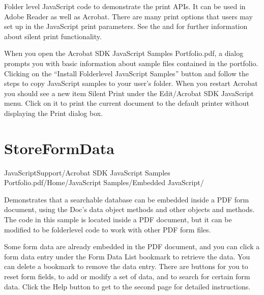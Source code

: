 \documentclass[letterpaper,12pt,english,openany,oneside]{sphinxmanual}
\begin{document}
\label{\detokenize{Samples_JavaScript:description-17}}

Folder level JavaScript code to demonstrate the print APIs. It can be used in Adobe Reader as well as Acrobat. There are many print options that users may set up in the JavaScript print parameters. See the  and  for further information about silent print functionality.

\label{\detokenize{Samples_JavaScript:usage-6}}

When you open the Acrobat SDK JavaScript Samples Portfolio.pdf, a dialog prompts you with basic information about sample files contained in the portfolio. Clicking on the “Install Folder\sphinxhyphen{}level JavaScript Samples” button and follow the steps to copy JavaScript samples to your user’s  folder. When you restart Acrobat you should see a new item Silent Print under the Edit/Acrobat SDK JavaScript menu. Click on it to print the current document to the default printer without displaying the Print dialog box.


\section{StoreFormData}
\label{\detokenize{Samples_JavaScript:storeformdata}}\label{\detokenize{Samples_JavaScript:location-18}}

JavaScriptSupport/Acrobat SDK JavaScript Samples Portfolio.pdf/Home/JavaScript Samples/Embedded JavaScript/

\label{\detokenize{Samples_JavaScript:description-18}}

Demonstrates that a searchable database can be embedded inside a PDF form document, using the Doc’s data object methods and other objects and methods. The code in this sample is located inside a PDF document, but it can be modified to be folder\sphinxhyphen{}level code to work with other PDF form files.

\label{\detokenize{Samples_JavaScript:usage-7}}

Some form data are already embedded in the PDF document, and you can click a form data entry under the Form Data List bookmark to retrieve the data. You can delete a bookmark to remove the data entry. There are buttons for you to reset form fields, to add or modify a set of data, and to search for certain form data. Click the Help button to get to the second page for detailed instructions.
\end{document}
